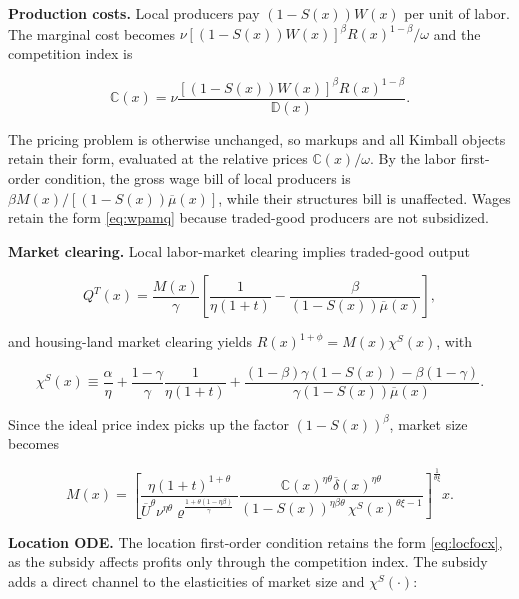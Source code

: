 \textbf{Production costs.} Local producers pay $(1-S(x))W(x)$ per unit of labor. The marginal cost becomes $\nu [(1-S(x))W(x)]^\beta R(x)^{1-\beta}/\omega$ and the competition index is

\begin{equation*}
	\mathbb{C}(x) = \nu \frac{[(1-S(x))W(x)]^\beta R(x)^{1-\beta}}{\mathbb{D}(x)}.
\end{equation*}

The pricing problem is otherwise unchanged, so markups and all Kimball objects retain their form, evaluated at the relative prices $\mathbb{C}(x)/\omega$. By the labor first-order condition, the gross wage bill of local producers is $\beta M(x)/[(1-S(x))\overline{\mu}(x)]$, while their structures bill is unaffected. Wages retain the form \eqref{eq:wpamq} because traded-good producers are not subsidized.

\textbf{Market clearing.} Local labor-market clearing implies traded-good output

\begin{equation*}
	Q^T(x) = \frac{M(x)}{\gamma}\left[\frac{1}{\eta(1+t)} - \frac{\beta}{(1-S(x))\overline{\mu}(x)}\right],
\end{equation*}

and housing-land market clearing yields $R(x)^{1+\phi} = M(x)\chi^S(x)$, with

\begin{equation*}
	\chi^S(x) \equiv \frac{\alpha}{\eta} + \frac{1-\gamma}{\gamma}\frac{1}{\eta(1+t)} + \frac{(1-\beta)\gamma(1-S(x)) - \beta(1-\gamma)}{\gamma(1-S(x))\overline{\mu}(x)}.
\end{equation*}

Since the ideal price index picks up the factor $(1-S(x))^\beta$, market size becomes

\begin{equation*}
	M(x) = \left[\frac{\eta (1+t)^{1+\theta}}{\overline{U}^\theta {\nu}^{\eta \theta} \varrho^{\frac{1+\theta(1-\eta \beta)}{\gamma}}} \frac{{\mathbb{C}(x)}^{\eta \theta} \overline{\delta} \left(x\right)^{\eta \theta} }{(1-S(x))^{\eta\beta\theta}\, \chi^S\left(x\right)^{\theta\xi - 1}} \right]^{\frac{1}{\theta\xi}} x.
\end{equation*}

\textbf{Location ODE.} The location first-order condition retains the form \eqref{eq:locfocx}, as the subsidy affects profits only through the competition index. The subsidy adds a direct channel to the elasticities of market size and $\chi^S(\cdot)$:

